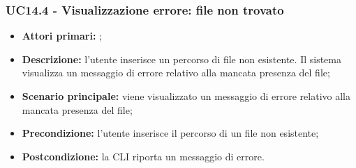 \subsubsection{UC14.4 - Visualizzazione errore: file non trovato}
\begin{itemize}
	\item \textbf{Attori primari:} \us{};
	\item \textbf{Descrizione:} l’utente inserisce un percorso di file non esistente. Il sistema visualizza un messaggio di errore relativo alla mancata presenza del file;
	\item \textbf{Scenario principale:} viene visualizzato un messaggio di errore relativo alla mancata presenza del file;
	\item \textbf{Precondizione:} l’utente inserisce il percorso di un file non esistente; 
	\item \textbf{Postcondizione:} la CLI riporta un messaggio di errore.
\end{itemize}